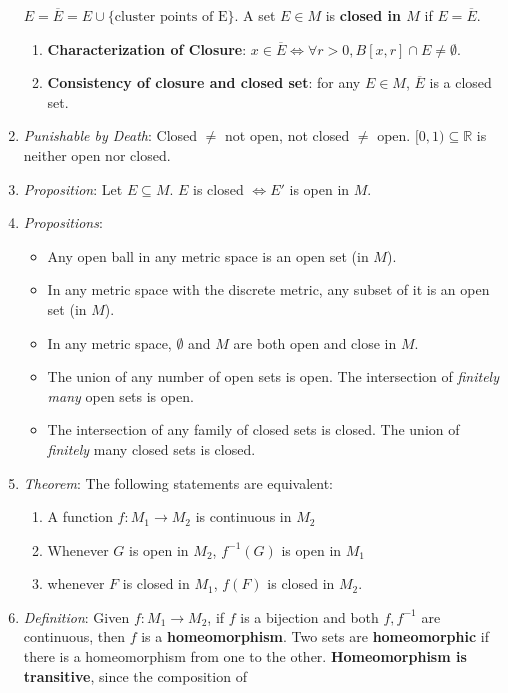 \documentclass[10pt]{article}
\newcommand{\real}{\mathbb{R}}
\begin{document}
\begin{multicols*}{3}
\begin{enumerate}
			$E=\overline{E}=E\cup\{\text{cluster points of E}\}$.
			A set $E\in M$ is \textbf{closed in $M$} if
			$E=\overline{E}$.
			\begin{enumerate}
			\item \textbf{Characterization of Closure}:
			$x\in\overline{E}\iff\forall r>0,B[x,r]\cap E\neq\emptyset$.
		\item \textbf{Consistency of closure and closed set}: for any
			$E\in M$, $\overline{E}$ is a closed set.
			\end{enumerate}
			\item \emph{Punishable by Death}: Closed $\neq$ not open, not closed
			$\neq$ open. $[0,1)\subseteq\real$ is neither open nor closed.
			\item \emph{Proposition}: Let $E\subseteq M$. $E$ is closed
			$\iff E'$ is open in $M$.
			\item \emph{Propositions}:
			\begin{itemize}
				\item Any open ball in any metric space is an open set (in $M$).
				\item In any metric space with the discrete metric, any subset of it is
				an open set (in $M$).
				\item In any metric space, $\emptyset$ and $M$ are both open and close in
					$M$.
			\item The union of any number of open sets is open. The
			intersection of \emph{finitely many} open sets is open.
			\item The intersection of any family of closed sets is
			closed. The union of \emph{finitely }many closed sets is closed.
			\end{itemize}
			\item \emph{Theorem}: The following statements are equivalent:
			\begin{enumerate}
				\item A function $f:M_{1}\to M_{2}$ is continuous in $M_{2}$
				\item Whenever $G$ is open in $M_{2}$, $f^{-1}(G)$ is open in
				$M_{1}$
				\item whenever $F$ is closed in $M_{1}$, $f(F)$ is closed in
			$M_{2}$.
			\end{enumerate}
			\item \emph{Definition}: Given $f:M_{1}\to M_{2}$, if $f$ is a bijection
			and both $f, f^{-1}$ are continuous, then $f$ is a \textbf{homeomorphism}.
			Two sets are \textbf{homeomorphic} if there is a homeomorphism from one to
			the other. \textbf{Homeomorphism is transitive}, since the composition of

\end{enumerate}
\end{multicols*}
\end{document}
